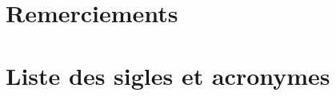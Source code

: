 \documentclass[a4paper,12pt,calibri,oneside,openany]{book}
\theoremstyle{break}
\begin{document}

\frontmatter

\chapter*{Remerciements}


\tableofcontents

\mainmatter
\pagestyle{fancy}











\appendix






	



\chapter*{Liste des sigles et acronymes}
\begin{acronym}[EHPAD] %

\end{acronym}


\listoffigures

\listoftables
\nopagebreak


\printindex
\end{document}

